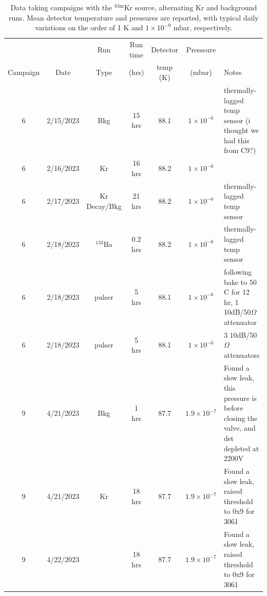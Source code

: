 \documentclass[nofootinbib,superscriptaddress, aps, prc, 
10pt, amsmath, amssymb, bibnotes,
altaffilletter, twocolumn, floatfix]{revtex4-2}
\def\kr83{{${}^{83\mathrm{m}}$Kr}}
\begin{document}
    \begin{table}[ht]
        \caption{Data taking campaigns with the \kr83 source, alternating Kr and background runs.  
        Mean detector temperature and pressures are reported, with typical daily variations on the order of 1 K and $1 \times 10^{-9}$ mbar, respectively.}
        \begin{tabular}{ccccccl}
            \hline\hline
                     &      & Run   & Run time & Detector & Presssure &  \\
            Campaign & Date & Type  & (hrs)    & temp (K) & (mbar)         & Notes \\
            \hline\hline
            6 & 2/15/2023 & Bkg & 15 hrs & 88.1 & $1 \times 10^{-6}$ & thermally-lagged temp sensor (i thought we had this from C9?) \\
            6 & 2/16/2023 & Kr & 16 hrs & 88.2 & $1 \times 10^{-6}$ & \\
            6 & 2/17/2023 & Kr Decay/Bkg & 21 hrs & 88.2 & $1 \times 10^{-6}$ & thermally-lagged temp sensor \\
            6 & 2/18/2023 & $^{133}$Ba & 0.2 hrs & 88.2 & $1 \times 10^{-6}$ & thermally-lagged temp sensor \\
            6 & 2/18/2023 & pulser & 5 hrs & 88.1 & $1 \times 10^{-6}$ & following bake to 50 C for 12 hr, 1 10dB/50$\Omega$ attenuator \\
            6 & 2/18/2023 & pulser & 5 hrs & 88.1 & $1 \times 10^{-6}$ & 3 10dB/50$\Omega$ attenuators\\
            9 & 4/21/2023 & Bkg & 1 hrs & 87.7 & $1.9\times 10^{-7}$ & Found a slow leak, this pressure is before closing the valve, and det depleted at 2200V \\
            9 & 4/21/2023 & Kr & 18 hrs & 87.7 & $1.9\times 10^{-7}$ & Found a slow leak, raised threshold to 0x9 for 3061 \\
            9 & 4/22/2023 &  & 18 hrs & 87.7 & $1.9\times 10^{-7}$ & Found a slow leak, raised threshold to 0x9 for 3061 \\
            \hline\hline
        \end{tabular}
        \label{tab:campaigns}
    \end{table}
    
\end{document}
